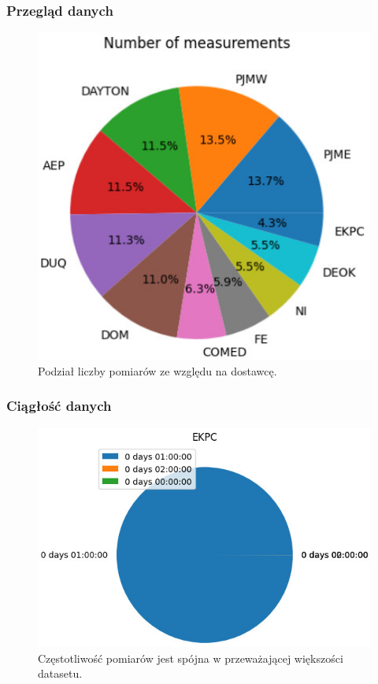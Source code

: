 \documentclass[]{beamer}
\begin{document}
\begin{frame}
  \frametitle{Przegląd danych}

  \begin{figure}
    \centering
    \includegraphics[width=0.5\linewidth]{pie_chart.jpg}
    \caption{Podział liczby pomiarów ze względu na dostawcę.}
  \end{figure}

\end{frame}




\begin{frame}
  \frametitle{Ciągłość danych}

  \begin{figure}
    \centering
    \includegraphics[width=0.6\linewidth]{consistency.jpg}
    \caption{Częstotliwość pomiarów jest spójna w przeważającej większości datasetu.}
  \end{figure}

\end{frame}
\end{document}
